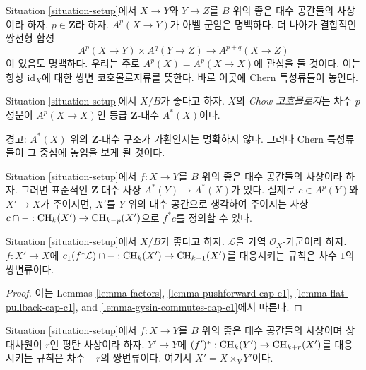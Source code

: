 \noindent
Situation \ref{situation-setup}에서 $X \to Y$와 $Y \to Z$를
$B$ 위의 좋은 대수 공간들의 사상이라 하자.
$p \in \mathbf{Z}$라 하자. $A^p(X \to Y)$가 아벨 군임은 명백하다.
더 나아가 결합적인 쌍선형 합성
$$
A^p(X \to Y) \times A^q(Y \to Z) \to A^{p + q}(X \to Z)
$$
이 있음도 명백하다.
우리는 주로 $A^p(X) = A^p(X \to X)$에 관심을 둘 것이다.
이는 항상 $\text{id}_X$에 대한 쌍변 코호몰로지류를 뜻한다.
바로 이곳에 Chern 특성류들이 놓인다.

\begin{definition}
\label{definition-chow-cohomology}
Situation \ref{situation-setup}에서 $X/B$가 좋다고 하자.
$X$의 {\it Chow 코호몰로지}는 차수 $p$ 성분이
$A^p(X \to X)$인 등급 $\mathbf{Z}$-대수 $A^*(X)$이다.
\end{definition}

\noindent
경고: $A^*(X)$ 위의 $\mathbf{Z}$-대수 구조가 가환인지는 명확하지 않다.
그러나 Chern 특성류들이 그 중심에 놓임을 보게 될 것이다.

\begin{remark}
\label{remark-pullback-cohomology}
Situation \ref{situation-setup}에서
$f : X \to Y$를 $B$ 위의 좋은 대수 공간들의 사상이라 하자.
그러면 표준적인 $\mathbf{Z}$-대수 사상 $A^*(Y) \to A^*(X)$가 있다.
실제로 $c \in A^p(Y)$와 $X' \to X$가 주어지면,
$X'$를 $Y$ 위의 대수 공간으로 생각하여 주어지는 사상
$c \cap - : \mathop{\mathrm{CH}}\nolimits_k(X') \to \mathop{\mathrm{CH}}\nolimits_{k - p}(X')$으로 $f^*c$를 정의할 수 있다.
\end{remark}

\begin{lemma}
\label{lemma-cap-c1-bivariant}
Situation \ref{situation-setup}에서 $X/B$가 좋다고 하자.
$\mathcal{L}$을 가역 $\mathcal{O}_X$-가군이라 하자.
$f : X' \to X$에
$c_1(f^*\mathcal{L}) \cap - : \mathop{\mathrm{CH}}\nolimits_k(X') \to \mathop{\mathrm{CH}}\nolimits_{k - 1}(X')$를
대응시키는 규칙은 차수 $1$의 쌍변류이다.
\end{lemma}

\begin{proof}
이는 Lemmas \ref{lemma-factors},
\ref{lemma-pushforward-cap-c1},
\ref{lemma-flat-pullback-cap-c1}, and
\ref{lemma-gysin-commutes-cap-c1}에서 따른다.
\end{proof}

\begin{lemma}
\label{lemma-flat-pullback-bivariant}
Situation \ref{situation-setup}에서
$f : X \to Y$를 $B$ 위의 좋은 대수 공간들의 사상이며
상대차원이 $r$인 평탄 사상이라 하자.
$Y' \to Y$에 $(f')^* : \mathop{\mathrm{CH}}\nolimits_k(Y') \to \mathop{\mathrm{CH}}\nolimits_{k + r}(X')$를
대응시키는 규칙은 차수 $-r$의 쌍변류이다. 여기서
$X' = X \times_Y Y'$이다.
\end{lemma}

